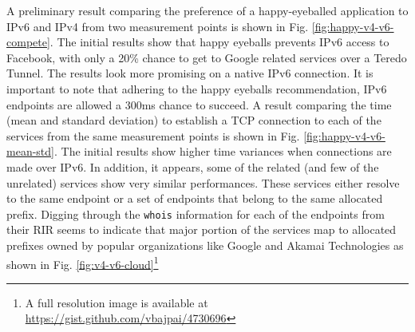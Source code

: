 A preliminary result comparing the preference of a happy-eyeballed application
to IPv6 and IPv4 from two measurement points is shown in Fig.
\ref{fig:happy-v4-v6-compete}. The initial results show that happy eyeballs
prevents IPv6 access to Facebook, with only a 20\% chance to get to Google
related services over a Teredo Tunnel. The results look more promising on a
native IPv6 connection. It is important to note that adhering to the happy
eyeballs recommendation, IPv6 endpoints are allowed a 300ms chance to succeed.
A result comparing the time (mean and standard deviation) to establish a TCP
connection to each of the services from the same measurement points is shown
in Fig. \ref{fig:happy-v4-v6-mean-std}. The initial results show higher time
variances when connections are made over IPv6. In addition, it appears, some
of the related (and few of the unrelated) services show very similar
performances.  These services either resolve to the same endpoint or a set of
endpoints that belong to the same allocated prefix. Digging through the
\texttt{whois} information for each of the endpoints from their \ac{RIR} seems
to indicate that major portion of the services map to allocated prefixes owned
by popular organizations like Google and Akamai Technologies as shown in Fig.
\ref{fig:v4-v6-cloud}\footnote{A full resolution image is available at
  \url{https://gist.github.com/vbajpai/4730696}}


